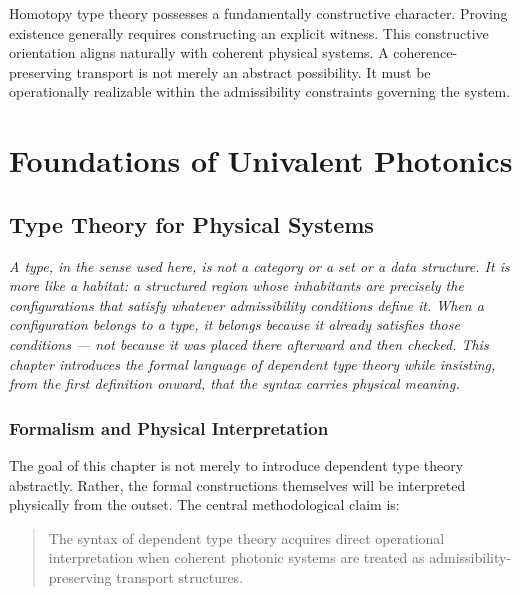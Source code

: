 \documentclass[11pt,openany]{book}
\theoremstyle{definition}
\theoremstyle{plain}
\begin{document}
Homotopy type theory possesses a fundamentally constructive character. Proving existence generally requires constructing an explicit witness. This constructive orientation aligns naturally with coherent physical systems. A coherence-preserving transport is not merely an abstract possibility. It must be operationally realizable within the admissibility constraints governing the system.


\part{Foundations of Univalent Photonics}


\chapter{Type Theory for Physical Systems}

\noindent\textit{A type, in the sense used here, is not a category or a set or a data structure. It is more like a habitat: a structured region whose inhabitants are precisely the configurations that satisfy whatever admissibility conditions define it. When a configuration belongs to a type, it belongs because it already satisfies those conditions --- not because it was placed there afterward and then checked. This chapter introduces the formal language of dependent type theory while insisting, from the first definition onward, that the syntax carries physical meaning.}

\bigskip

\section{Formalism and Physical Interpretation}

The goal of this chapter is not merely to introduce dependent type theory abstractly. Rather, the formal constructions themselves will be interpreted physically from the outset. The central methodological claim is:

\begin{quote}
The syntax of dependent type theory acquires direct operational interpretation when coherent photonic systems are treated as admissibility-preserving transport structures.
\end{quote}
\end{document}
